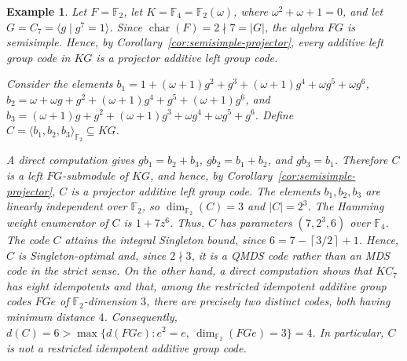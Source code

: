 \documentclass[11pt]{article}
\newtheorem{example}[theorem]{Example}
\begin{document}
\begin{example}\label{ex:semisimple-projector}
Let $F=\mathbb{F}_2$, let
$K=\mathbb{F}_4=\mathbb{F}_2(\omega)$, where
$\omega^2+\omega+1=0$, and let
$G=C_7=\langle g\mid g^7=1\rangle$. Since
$\operatorname{char}(F)=2\nmid 7=|G|$, the algebra $FG$ is semisimple.
Hence, by Corollary~\ref{cor:semisimple-projector}, every additive left group
code in $KG$ is a projector additive left group code.

Consider the elements
$b_1=1+(\omega+1)g^2+g^3+(\omega+1)g^4+\omega g^5+\omega g^6$,
$b_2=\omega+\omega g+g^2+(\omega+1)g^4+g^5+(\omega+1)g^6$, and
$b_3=(\omega+1)g+g^2+(\omega+1)g^3+\omega g^4+\omega g^5+g^6$.
Define $C=\langle b_1,b_2,b_3\rangle_{\mathbb{F}_2}\subseteq KG$.

A direct computation gives $gb_1=b_2+b_3$, $gb_2=b_1+b_2$, and $gb_3=b_1$.
Therefore $C$ is a left $FG$-submodule of $KG$, and hence, by
Corollary~\ref{cor:semisimple-projector}, $C$ is a projector additive left
group code. The elements $b_1,b_2,b_3$ are linearly independent
over $\mathbb{F}_2$, so $\dim_{\mathbb{F}_2}(C)=3$ and $|C|=2^3$. The
Hamming weight enumerator of $C$ is $1+7z^6$. Thus, $C$ has parameters
$(7,2^3,6)$ over $\mathbb{F}_4$.
The code $C$ attains the integral Singleton bound, since
$6=7-\left\lceil 3/2\right\rceil+1$. Hence, $C$ is Singleton-optimal and,
since $2\nmid 3$, it is a QMDS code rather than an MDS code in the strict
sense. On the other hand, a direct computation shows that $KC_7$ has eight
idempotents and that, among the restricted idempotent additive group codes
$FGe$ of $\mathbb{F}_2$-dimension $3$, there are precisely two distinct
codes, both having minimum distance $4$. Consequently,
$d(C)=6>\max\{d(FGe):e^2=e,\ \dim_{\mathbb{F}_2}(FGe)=3\}=4$. In particular,
$C$ is not a restricted idempotent additive group code.
\end{example}
\end{document}

